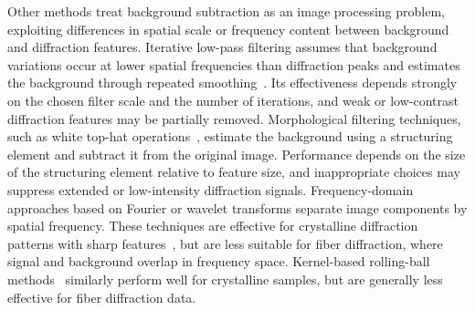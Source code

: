 \documentclass[iucr]{iucrjournals}
\begin{document}
Other methods treat background subtraction as an image processing problem, exploiting differences in spatial scale or frequency content between background and diffraction features. Iterative low-pass filtering assumes that background variations occur at lower spatial frequencies than diffraction peaks and estimates the background through repeated smoothing~\cite{IvanovaMakowski1998}. Its effectiveness depends strongly on the chosen filter scale and the number of iterations, and weak or low-contrast diffraction features may be partially removed. Morphological filtering techniques, such as white top-hat operations~\cite{GonzalezWoodsDIP4e}, estimate the background using a structuring element and subtract it from the original image. Performance depends on the size of the structuring element relative to feature size, and inappropriate choices may suppress extended or low-intensity diffraction signals. Frequency-domain approaches based on Fourier or wavelet transforms separate image components by spatial frequency. These techniques are effective for crystalline diffraction patterns with sharp features~\cite{PolarBackground2024, WaveletBiomedOptExpress2021, renedecotret2017baseline}, but are less suitable for fiber diffraction, where signal and background overlap in frequency space. Kernel-based rolling-ball methods~\cite{Sternberg1983} similarly perform well for crystalline samples, but are generally less effective for fiber diffraction data.
\end{document}

